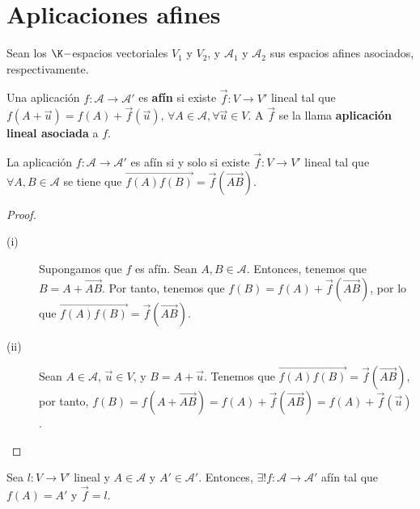 \section{Aplicaciones afines}
Sean los $\displaystyle \K- $espacios vectoriales $\displaystyle V_{1} $ y $\displaystyle V_{2} $, y $\displaystyle \mathcal{A}_{1} $ y $\displaystyle \mathcal{A}_{2} $ sus espacios afines asociados, respectivamente. 
\begin{fdefinition}
	\normalfont Una aplicación $\displaystyle f : \mathcal{A} \to \mathcal{A}' $ es \textbf{afín} si existe $\displaystyle \vec{f} : V \to V'$ lineal tal que $\displaystyle f\left(A + \vec{u}\right)= f\left(A\right) + \vec{f}\left(\vec{u}\right) $, $\displaystyle \forall A \in \mathcal{A},\forall\vec{u}\in V $. A $\displaystyle \vec{f} $ se la llama \textbf{aplicación lineal asociada} a $\displaystyle f $.
\end{fdefinition}
\begin{fprop}[]
	\normalfont La aplicación $\displaystyle f : \mathcal{A} \to \mathcal{A}' $ es afín si y solo si existe $\displaystyle \vec{f} : V \to V' $ lineal tal que $\displaystyle \forall A,B \in \mathcal{A} $ se tiene que $\displaystyle \overrightarrow{f\left(A\right)f\left(B\right)} = \vec{f}\left(\overrightarrow{AB}\right) $.
\end{fprop}
\begin{proof}
\begin{description}
	\item[(i)] Supongamos que $\displaystyle f $ es afín. Sean $\displaystyle A, B \in \mathcal{A} $. Entonces, tenemos que $\displaystyle B = A + \overrightarrow{AB} $. Por tanto, tenemos que $\displaystyle f\left(B\right) = f\left(A\right) + \vec{f}\left(\overrightarrow{AB}\right) $, por lo que $\displaystyle \overrightarrow{f\left(A\right)f\left(B\right)} = \vec{f}\left(\overrightarrow{AB}\right)$. 
	\item[(ii)] Sean $\displaystyle A \in \mathcal{A} $, $\displaystyle \vec{u} \in V $, y $\displaystyle B = A + \vec{u} $. Tenemos que $\displaystyle \overrightarrow{f\left(A\right)f\left(B\right)} = \vec{f}\left(\overrightarrow{AB}\right)$, por tanto, $\displaystyle f\left(B\right) = f\left(A + \overrightarrow{AB}\right) = f\left(A\right) + \vec{f}\left(\overrightarrow{AB}\right) = f\left(A\right) + \vec{f}\left(\vec{u}\right)$. 
\end{description}
\end{proof}
\begin{ftheorem}[]
\normalfont Sea $\displaystyle l : V\to V'$ lineal y $\displaystyle A \in \mathcal{A} $ y $\displaystyle A' \in \mathcal{A}' $. Entonces, $\displaystyle \exists! f : \mathcal{A}\to \mathcal{A}' $ afín tal que $\displaystyle f\left(A\right) = A' $ y $\displaystyle \vec{f} = l $.
\end{ftheorem}
